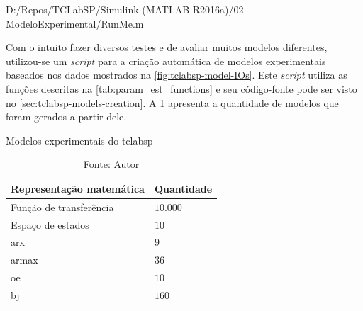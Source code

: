 
	{D:/Repos/TCLabSP/Simulink (MATLAB R2016a)/02-ModeloExperimental/RunMe.m}
	\begin{center}
    \end{center}

Com o intuito fazer diversos testes e de avaliar muitos modelos diferentes, utilizou-se um
\textit{script} para a criação automática de modelos experimentais baseados nos dados mostrados
na \cref{fig:tclabsp-model-IOs}. Este \textit{script} utiliza as funções descritas na \cref{tab:param_est_functions}
e seu código-fonte pode ser visto no \cref{sec:tclabsp-models-creation}. 
A \cref{tab:tclabsp-models-description} apresenta a quantidade de modelos que foram gerados a partir dele.

\begin{table}[h]
	\centering
	\caption{Modelos experimentais do \acrshort{tclabsp}}
	\label{tab:tclabsp-models-description}
	\begin{tabular}{ll} \toprule
		{Representação matemática}		                                & {Quantidade}          \\ \midrule
		Função de transferência		                                    & $10.000$              \\
		Espaço de estados   		                                    & $10$                  \\
		\acrshort{arx}		                                            & $9$                   \\
		\acrshort{armax}		                                        & $36$                  \\
		\acrshort{oe}													& $10$                  \\
		\acrshort{bj}                                   				& $160$                 \\ \bottomrule
	\end{tabular}
	\caption*{Fonte: Autor}
\end{table}

